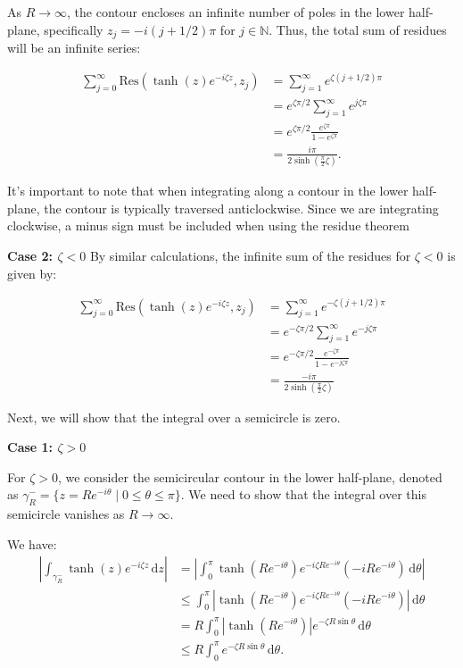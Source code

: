 \documentclass[a4paper,12pt]{article}
\newcommand{\Res}{\text{Res}}
\newcommand{\z}{\zeta}
\newcommand{\dd}{\mathrm{d}}
\begin{document}
As $R \to \infty$, the contour encloses an infinite number of poles in the lower half-plane, specifically $z_j = -i (j + 1/2)\pi$ for $j \in \mathbb{N}$. Thus, the total sum of residues will be an infinite series:

\begin{align*}
  \sum_{j=0}^{\infty} \Res(\tanh(z)e^{-i \z z}, z_j) &= \sum_{j=1}^{\infty} e^{\z (j + 1/2)\pi} \\
  &= e^{\z \pi/2} \sum_{j=1}^{\infty} e^{j\z \pi} \\
  &= e^{\z \pi/2} \frac{e^{\z \pi}}{1 - e^{\z \pi}}\\
  &=  \frac{i\pi}{2\sinh\left(\frac{\pi}{2} \z\right)}.
\end{align*}

It's important to note that when integrating along a contour in the lower half-plane, the contour is typically traversed anticlockwise.
Since we are integrating clockwise, a minus sign must be included when using the residue theorem

\bigskip

\textbf{Case 2: $\zeta < 0$}
By similar calculations, the infinite sum of the residues for $\z < 0$ is given by:

\begin{align*}
  \sum_{j=0}^{\infty} \Res(\tanh(z)e^{-i \z z}, z_j) &= \sum_{j=1}^{\infty} e^{-\z (j + 1/2)\pi} \\
  &= e^{-\z \pi/2} \sum_{j=1}^{\infty} e^{-j\z \pi} \\
  &= e^{-\z \pi/2} \frac{e^{-\z \pi}}{1 - e^{-j\z \pi}}\\
  &= \frac{-i\pi}{2\sinh\left(\frac{\pi}{2} \z\right)}
\end{align*}

\bigskip

Next, we will show that the integral over a semicircle is zero.

\bigskip

\textbf{Case 1: $\zeta > 0$}

For $\z > 0$, we consider the semicircular contour in the lower half-plane, denoted as $\gamma^-_R = \{ z = R e^{-i\theta} \mid 0 \leq \theta \leq \pi \}$.
We need to show that the integral over this semicircle vanishes as $R \to \infty$.

We have:
\begin{align*}
  \left|\int_{\gamma^-_R} \tanh(z)e^{-i \z z} \, \dd z\right| &= \left| \int_{0}^{\pi} \tanh(R e^{-i\theta}) e^{-i \z R e^{-i\theta}} (-i R e^{-i\theta}) \, \dd\theta \right| \\
  &\leq \int_{0}^{\pi} \left| \tanh(R e^{-i\theta}) e^{-i \z R e^{-i\theta}} (-i R e^{-i\theta}) \right| \, \dd\theta \\
  &=  R \int_{0}^{\pi} \left| \tanh(R e^{-i\theta})  \right|e^{ -\z R \sin \theta} \, \dd\theta \\
  &\leq  R \int_{0}^{\pi} e^{ -\z R \sin \theta} \, \dd\theta.
\end{align*}
\end{document}
